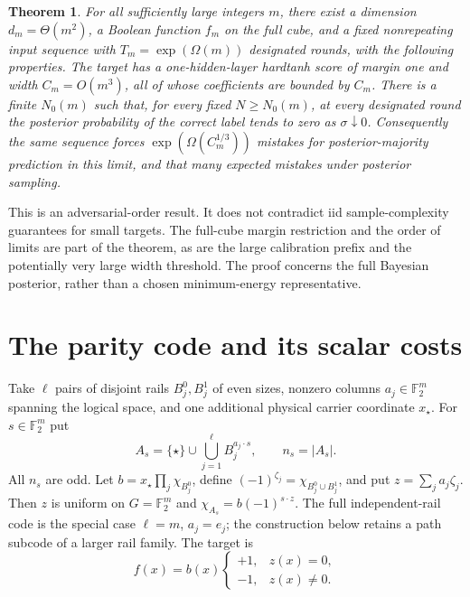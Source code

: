 \documentclass[11pt]{article}
\newtheorem{theorem}{Theorem}\newtheorem{lemma}[theorem]{Lemma}
\theoremstyle{remark}\newtheorem{remark}[theorem]{Remark}
\begin{document}
\begin{theorem}\label{thm:main}
For all sufficiently large integers $m$, there exist a dimension
$d_m=\Theta(m^2)$, a Boolean function $f_m$ on the full cube, and
a fixed nonrepeating input sequence with $T_m=\exp(\Omega(m))$
designated rounds, with the following properties.
The target has a one-hidden-layer hardtanh score of margin one and
width $C_m=O(m^3)$, all of whose coefficients are bounded by $C_m$.
There is a finite $N_0(m)$ such that, for every fixed $N\ge N_0(m)$,
at every designated round the posterior probability of the correct
label tends to zero as $\sigma\downarrow0$.
Consequently the same sequence forces
$\exp(\Omega(C_m^{1/3}))$ mistakes for posterior-majority prediction
in this limit, and that many expected mistakes under posterior sampling.
\end{theorem}

This is an adversarial-order result. It does not contradict iid
sample-complexity guarantees for small targets. The full-cube margin
restriction and the order of limits are part of the theorem, as are the
large calibration prefix and the potentially very large width threshold.
The proof concerns the full Bayesian posterior, rather than a chosen
minimum-energy representative.

\section{The parity code and its scalar costs}

Take $\ell$ pairs of disjoint rails $B_j^0,B_j^1$ of even sizes,
nonzero columns $a_j\in\mathbb F_2^m$ spanning the logical space,
and one additional physical carrier coordinate $x_\star$.
For $s\in\mathbb F_2^m$ put
\[
 A_s=\{\star\}\cup\bigcup_{j=1}^{\ell}B_j^{a_j\cdot s},
 \qquad n_s=|A_s|.
\]
All $n_s$ are odd. Let $b=x_\star\prod_j\chi_{B_j^0}$, define
$(-1)^{\zeta_j}=\chi_{B_j^0\cup B_j^1}$, and put
$z=\sum_j a_j\zeta_j$. Then $z$ is uniform on $G=\mathbb F_2^m$ and
$\chi_{A_s}=b(-1)^{s\cdot z}$.
The full independent-rail code is the special case $\ell=m$, $a_j=e_j$;
the construction below retains a path subcode of a larger rail family.
The target is
\begin{equation}\label{eq:target}
 f(x)=b(x)\begin{cases}+1,&z(x)=0,\\-1,&z(x)\ne0.\end{cases}
\end{equation}
\end{document}
